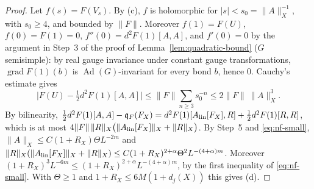 \begin{proof}
Let $f(s)=F(V_s)$. By (c), $f$ is holomorphic for $|s|<s_0=\|A\|_X^{-1}$, with $s_0\ge4$, and bounded by $\|F\|$. Moreover $f(1)=F(U)$, $f(0)=F(1)=0$, $f''(0)=d^2F(1)[A,A]$, and $f'(0)=0$ by the argument in Step~3 of the proof of Lemma~\ref{lem:quadratic-bound} ($G$ semisimple): by real gauge invariance under constant gauge transformations, $\operatorname{grad}F(1)(b)$ is $\operatorname{Ad}(G)$-invariant for every bond $b$, hence $0$. Cauchy's estimate gives
\[
\big|F(U)-\tfrac12d^2F(1)[A,A]\big|\le\|F\|\sum_{n\ge3}s_0^{-n}\le2\|F\|\,\|A\|_X^3 .
\]
By bilinearity, $\frac12d^2F(1)[A,A]-\mathfrak q_F(F_X)=d^2F(1)[A_{\rm lin}[F_X],R]+\frac12d^2F(1)[R,R]$, which is at most $4\|F\|\,\|R\|_X\big(\|A_{\rm lin}[F_X]\|_X+\|R\|_X\big)$. By Step~5 and \eqref{eq:nf-small}, $\|A\|_X\le C(1+R_X)\Theta L^{-2m}$ and $\|R\|_X(\|A_{\rm lin}[F_X]\|_X+\|R\|_X)\le C(1+R_X)^{2+\alpha}\Theta^2L^{-(4+\alpha)m}$. Moreover $(1+R_X)^3L^{-6m}\le(1+R_X)^{2+\alpha}L^{-(4+\alpha)m}$, by the first inequality of \eqref{eq:nf-small}. With $\Theta\ge1$ and $1+R_X\le6M(1+d_j(X))$ this gives (d).
\end{proof}

